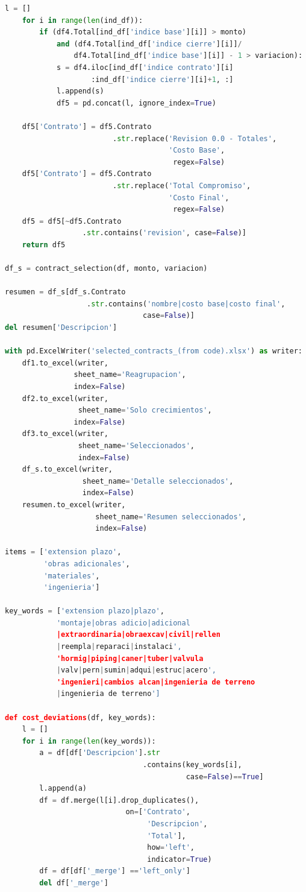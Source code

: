 \begin{lstlisting}[language=Python]
    l = []
    for i in range(len(ind_df)):
        if (df4.Total[ind_df['indice base'][i]] > monto)
            and (df4.Total[ind_df['indice cierre'][i]]/
                df4.Total[ind_df['indice base'][i]] - 1 > variacion):
            s = df4.iloc[ind_df['indice contrato'][i]
                    :ind_df['indice cierre'][i]+1, :]
            l.append(s)
            df5 = pd.concat(l, ignore_index=True) 

    df5['Contrato'] = df5.Contrato
                         .str.replace('Revision 0.0 - Totales', 
                                      'Costo Base',
                                       regex=False)
    df5['Contrato'] = df5.Contrato
                         .str.replace('Total Compromiso', 
                                      'Costo Final', 
                                       regex=False)
    df5 = df5[~df5.Contrato
                  .str.contains('revision', case=False)]
    return df5

df_s = contract_selection(df, monto, variacion)

resumen = df_s[df_s.Contrato
                   .str.contains('nombre|costo base|costo final', 
                                case=False)]
del resumen['Descripcion']

with pd.ExcelWriter('selected_contracts_(from code).xlsx') as writer:
    df1.to_excel(writer, 
                sheet_name='Reagrupacion', 
                index=False)
    df2.to_excel(writer, 
                 sheet_name='Solo crecimientos', 
                index=False)
    df3.to_excel(writer, 
                 sheet_name='Seleccionados', 
                 index=False)
    df_s.to_excel(writer, 
                  sheet_name='Detalle seleccionados', 
                  index=False)
    resumen.to_excel(writer, 
                     sheet_name='Resumen seleccionados', 
                     index=False)

items = ['extension plazo', 
         'obras adicionales', 
         'materiales', 
         'ingenieria']

key_words = ['extension plazo|plazo', 
            'montaje|obras adicio|adicional
            |extraordinaria|obraexcav|civil|rellen
            |reempla|reparaci|instalaci', 
            'hormig|piping|caner|tuber|valvula
            |valv|pern|sumin|adqui|estruc|acero', 
            'ingenieri|cambios alcan|ingenieria de terreno
            |ingenieria de terreno'] 

def cost_deviations(df, key_words):
    l = []
    for i in range(len(key_words)):
        a = df[df['Descripcion'].str
                                .contains(key_words[i], 
                                          case=False)==True] 
        l.append(a)
        df = df.merge(l[i].drop_duplicates(), 
                            on=['Contrato', 
                                 'Descripcion', 
                                 'Total'], 
                                 how='left', 
                                 indicator=True)
        df = df[df['_merge'] =='left_only']
        del df['_merge']


\end{lstlisting}
